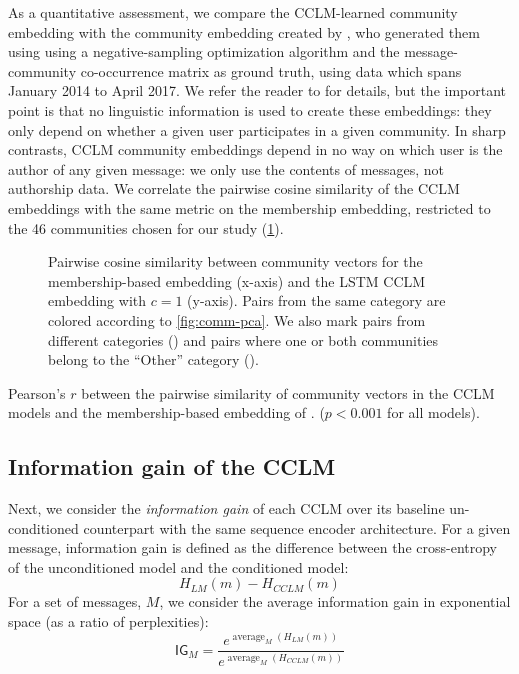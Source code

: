 \documentclass[11pt]{article}
\newcommand\jp[1]{\todo[backgroundcolor=blue!10]{JP: #1}}
\newcommand\IG{\mathsf{IG}}
\DeclareMathOperator*{\avg}{average}
\begin{document}
As a quantitative assessment, we compare the CCLM-learned community
embedding with the community embedding created by \citet{Kumar2018},
who generated them using using a negative-sampling optimization
algorithm and the message-community co-occurrence matrix as ground
truth, using data which spans January 2014 to April 2017.
We refer the reader
to \citet{Kumar2018}
for details, but the important point is that no linguistic
information is used to create these embeddings: they only depend on
whether a given user participates in a given
community. In sharp contrasts, CCLM community embeddings depend in no
way on which user is the author of any given message: we only use the
contents of messages, not authorship data.
%
We correlate the pairwise cosine similarity of the
CCLM embeddings with the same metric on the membership embedding,
restricted to the 46 communities chosen for our study
(\cref{fig:pairwise-comm-sim}).

\begin{figure}
  \caption{Pairwise cosine similarity between community vectors for 
    the membership-based embedding (x-axis) and
  the LSTM CCLM embedding with $c=1$ (y-axis). 
  Pairs from the same category are colored according to \cref{fig:comm-pca}.
  We also mark pairs from different categories (\texttimes) and pairs where one or both
  communities belong to the ``Other'' category (\textbigcircle).
  }
  \label{fig:pairwise-comm-sim}
\end{figure}

\begin{table}
  \small
  \centering
  
  \caption{Pearson's $r$ between the pairwise similarity of community vectors
  in the CCLM models and the membership-based embedding of \citet{Kumar2018}.
  ($p<0.001$ for all models).
  }
  \label{tab:pairwise-comm-sim}
\end{table}

\subsection{Information gain of the CCLM}

Next, we consider the \emph{information gain} of each CCLM over its baseline
un-conditioned counterpart with the same sequence encoder architecture.
For a given message, information gain is defined as the difference
between the cross-entropy of the unconditioned model and the conditioned model:
\[H_{LM}(m) - H_{CCLM}(m)\]
For a set of messages, $M$, we consider the average information gain
in exponential space (as a ratio of perplexities):
\[\IG_M = \frac{e^{\avg_M(H_{LM}(m))}}{e^{\avg_M(H_{CCLM}(m))}}\]
\end{document}
